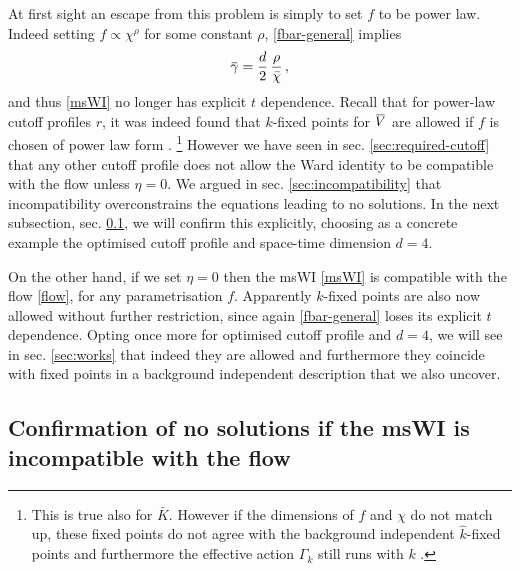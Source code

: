 \documentclass[11pt]{book}
\newcommand{\overbar}[1]{\mkern 1.5mu\overline{\mkern-1.5mu#1\mkern-1.5mu}\mkern 1.5mu}
\newcommand{\bV}{\overbar V}
\newcommand{\bg}{\overbar \gamma}
\newcommand{\bc}{\bar \chi}
\numberwithin{equation}{chapter}
\begin{document}
At first sight an escape from this problem is simply to set $f$ to be power law.
Indeed setting $f\propto\chi^{\rho}$ for some constant $\rho$, \eqref{fbar-general} implies
\begin{align}
  \bg = \frac{d}{2} \, \frac{\rho}{\bc}\,,
  \label{powlaw-gamma}
\end{align}
and thus \eqref{msWI} no longer has explicit $t$ dependence.
Recall that for power-law cutoff profiles $r$, it was indeed found that $k$-fixed points for $\bV$
are allowed if $f$ is chosen of power law form \cite{Dietz:2015owa}.%
\footnote{This is true also for $\bar{K}$. However if the dimensions of $f$ and $\chi$ do not match up,
  these fixed points do not agree with the background independent $\hat{k}$-fixed points and furthermore
the effective action $\Gamma_k$ still runs with $k$ \cite{Dietz:2015owa}.}
However we have seen in sec. \ref{sec:required-cutoff} that any other cutoff profile does
not allow the Ward identity to be compatible with the flow unless $\eta=0$.
We argued in sec. \ref{sec:incompatibility} that incompatibility overconstrains the equations
leading to no solutions. In the next subsection, sec. \ref{sec:incompatible-no-solns},
we will confirm this explicitly, choosing as a concrete example the optimised cutoff profile and
space-time dimension $d=4$.

On the other hand, if we set $\eta=0$ then the msWI \eqref{msWI} is compatible with the flow \eqref{flow},
for any parametrisation $f$. Apparently $k$-fixed points are also now allowed without further restriction,
since again \eqref{fbar-general} loses its explicit $t$ dependence.
Opting once more for optimised cutoff profile and $d=4$, we will see in sec. \ref{sec:works} that
indeed they are allowed and furthermore they coincide with fixed points in a background independent
description that we also uncover.


\subsection{Confirmation of no solutions if the msWI is incompatible with the flow}
\label{sec:incompatible-no-solns}
\end{document}
